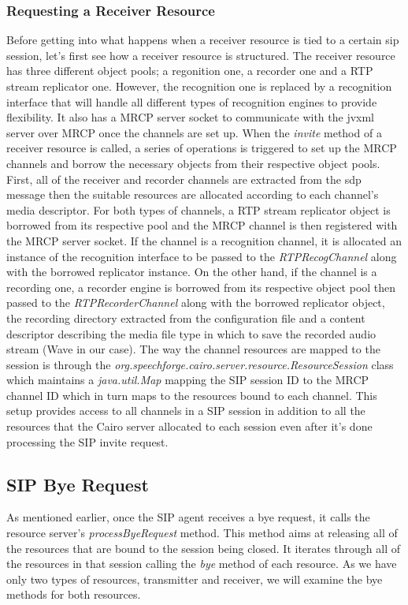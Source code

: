 \subsubsection{Requesting a Receiver Resource}
Before getting into what happens when a receiver resource is tied to a certain \ac{sip} session, let's first see how a receiver resource is structured.
The receiver resource has three different object pools; a regonition one, a recorder one and a RTP stream replicator one.
However, the recognition one is replaced by a recognition interface that will handle all different types of recognition engines to provide flexibility.
It also has a MRCP server socket to communicate with the \ac{jvxml} server over MRCP once the channels are set up.
When the \textit{invite} method of a receiver resource is called, a series of operations is triggered to set up the MRCP channels and borrow the necessary objects from their respective object pools.
First, all of the receiver and recorder channels are extracted from the \ac{sdp} message then the suitable resources are allocated according to each channel's media descriptor.
For both types of channels, a RTP stream replicator object is borrowed from its respective pool and the MRCP channel is then registered with the MRCP server socket.
If the channel is a recognition channel, it is allocated an instance of the recognition interface to be passed to the \textit{RTPRecogChannel} along with the borrowed replicator instance.
On the other hand, if the channel is a recording one, a recorder engine is borrowed from its respective object pool then passed to the \textit{RTPRecorderChannel} along with the borrowed replicator object, the recording directory extracted from the configuration file and a content descriptor describing the media file type in which to save the recorded audio stream (Wave in our case).
The way the channel resources are mapped to the session is through the \textit{org.speechforge.cairo.server.resource.ResourceSession} class which maintains a \textit{java.util.Map} mapping the SIP session ID to the MRCP channel ID which in turn maps to the resources bound to each channel.
This setup provides access to all channels in a SIP session in addition to all the resources that the Cairo server allocated to each session even after it's done processing the SIP invite request.

\subsection{SIP Bye Request}
As mentioned earlier, once the SIP agent receives a bye request, it calls the resource server's \textit{processByeRequest} method.
This method aims at releasing all of the resources that are bound to the session being closed.
It iterates through all of the resources in that session calling the \textit{bye} method of each resource.
As we have only two types of resources, transmitter and receiver, we will examine the bye methods for both resources.

